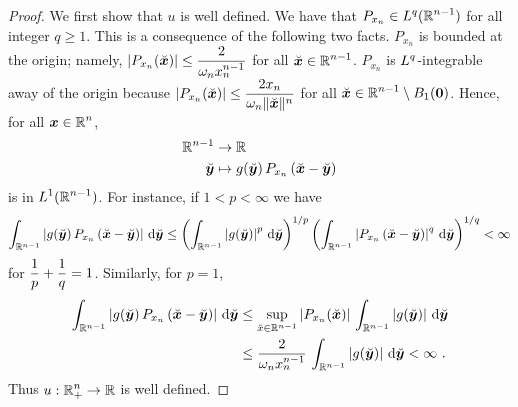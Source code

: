 
\begin{proof}
 We first show that $u$ is well defined.  We have that
$\displaystyle P_{x_n} \in L^q(\mathbb{R}^{n-1})$ for all integer $q \geq 1$.
This is a consequence of the following two facts.
$P_{x_n}$ is bounded at the origin; namely,
$\displaystyle \left| P_{x_n}(\breve{{\bm{x}}})\right| \leq 
\frac{2}{\omega_{n} x_n^{n-1}}$ for all
$\displaystyle \breve{{\bm{x}}} \in \mathbb{R}^{n-1}$.
$P_{x_n}$ is $\displaystyle L^q$-integrable away of the origin because
$\displaystyle \left| P_{x_n}(\breve{{\bm{x}}})\right| \leq
\frac{2 x_n}{\omega_{n} \|\breve{{\bm{x}}}\|^n}$
for all $\displaystyle \breve{{\bm{x}}} \in \mathbb{R}^{n-1}\setminus B_1({\bm{0}})$.
Hence, for all $\displaystyle {\bm{x}}\in \mathbb{R}^n$,
\begin{align*}
\mathbb{R}^{n-1} & \rightarrow \mathbb{R} \\
\breve{{\bm{y}}} & \mapsto g(\breve{{\bm{y}}})\,
P_{x_n}\left(\breve{{\bm{x}}} - \breve{{\bm{y}}}\right)
\end{align*}
is in $\displaystyle L^1(\mathbb{R}^{n-1})$.  For instance, if $1<p<\infty$ we have
\[
\int_{\mathbb{R}^{n-1}} \left| g(\breve{{\bm{y}}})\,
P_{x_n}\left(\breve{{\bm{x}}} - \breve{{\bm{y}}}\right) \right|
\,\mathrm{d}{\breve{{\bm{y}}}}
\leq
\left( \int_{\mathbb{R}^{n-1}} \left|g(\breve{{\bm{y}}}) \right|^p
\,\mathrm{d}{\breve{{\bm{y}}}} \right)^{1/p}
\left( \int_{\mathbb{R}^{n-1}} \left|
P_{x_n}\left(\breve{{\bm{x}}} - \breve{{\bm{y}}}\right) \right|^q
\,\mathrm{d}{\breve{{\bm{y}}}} \right)^{1/q} < \infty
\]
for $\displaystyle \frac{1}{p} + \frac{1}{q} = 1$.
Similarly, for $p=1$,
\begin{align*}
\int_{\mathbb{R}^{n-1}} \left| g(\breve{{\bm{y}}})\,
P_{x_n}\left(\breve{{\bm{x}}} - \breve{{\bm{y}}}\right) \right|
\,\mathrm{d}{\breve{{\bm{y}}}}
& \leq \sup_{\breve{x} \in \mathbb{R}^{n-1}} |P_{x_n}(\breve{{\bm{x}}})|
\, \int_{\mathbb{R}^{n-1}} \left|g(\breve{{\bm{y}}}) \right|
\,\mathrm{d}{\breve{{\bm{y}}}} \\
&\leq \frac{2}{\omega_n x_n^{n-1}}
\, \int_{\mathbb{R}^{n-1}} \left|g(\breve{{\bm{y}}}) \right| \,\mathrm{d}{\breve{{\bm{y}}}}
< \infty \ .
\end{align*}
Thus $\displaystyle u:\mathbb{R}^n_+\rightarrow \mathbb{R}$ is well defined.


\end{proof}
